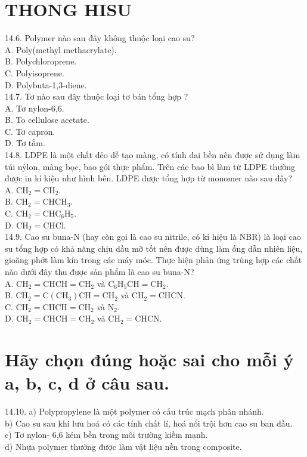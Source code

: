 \documentclass[10pt]{article}
\begin{document}
\section*{THONG HISU}
14.6. Polymer nào sau đây không thuộc loại cao su?\\
A. Poly(methyl methacrylate).\\
B. Polychloroprene.\\
C. Polyisoprene.\\
D. Polybuta-1,3-diene.\\
14.7. Tơ nào sau đây thuộc loại tơ bán tổng hợp ?\\
A. Tơ nylon-6,6.\\
B. To cellulose acetate.\\
C. Tơ capron.\\
D. Tơ tằm.\\
14.8. LDPE là một chất dẻo dễ tạo màng, có tính dai bền nên được sử dụng làm túi nỷlon, màng bọc, bao gói thực phẩm. Trên các bao bì làm từ LDPE thường được in kí kiệu như hình bên. LDPE được tổng hợp từ monomer nào sau đây?\\
A. $\mathrm{CH}_{2}=\mathrm{CH}_{2}$.\\
B. $\mathrm{CH}_{2}=\mathrm{CHCH}_{3}$.\\
C. $\mathrm{CH}_{2}=\mathrm{CHC}_{6} \mathrm{H}_{5}$.\\
D. $\mathrm{CH}_{2}=\mathrm{CHCl}$.\\
14.9. Cao su buna-N (hay còn gọi là cao su nitrile, có kí hiệu là NBR) là loại cao su tổng hợp có khả năng chịu dầu mỡ tốt nên được dùng làm ống dẫn nhiên liệu, gioăng phớt làm kín trong các máy móc. Thực hiện phản ứng trùng hợp các chất nào dưới đây thu được sản phẩm là cao su buna-N?\\
A. $\mathrm{CH}_{2}=\mathrm{CHCH}=\mathrm{CH}_{2}$ và $\mathrm{C}_{6} \mathrm{H}_{5} \mathrm{CH}=\mathrm{CH}_{2}$.\\
B. $\mathrm{CH}_{2}=\mathrm{C}\left(\mathrm{CH}_{3}\right) \mathrm{CH}=\mathrm{CH}_{2}$ và $\mathrm{CH}_{2}=\mathrm{CHCN}$.\\
C. $\mathrm{CH}_{2}=\mathrm{CHCH}=\mathrm{CH}_{2}$ và $\mathrm{N}_{2}$.\\
D. $\mathrm{CH}_{2}=\mathrm{CHCH}=\mathrm{CH}_{2}$ và $\mathrm{CH}_{2}=\mathrm{CHCN}$.

\section*{Hãy chọn đúng hoặc sai cho mỗi ý a, b, c, d ở câu sau.}
14.10. a) Polypropylene là một polymer có cấu trúc mạch phân nhánh.\\
b) Cao su sau khi lưu hoá có các tính chất lí, hoá nổi trội hơn cao su ban đầu.\\
c) Tơ nylon- 6,6 kém bền trong môi trường kiềm mạnh.\\
d) Nhựa polymer thường được làm vật liệu nền trong composite.
\end{document}
